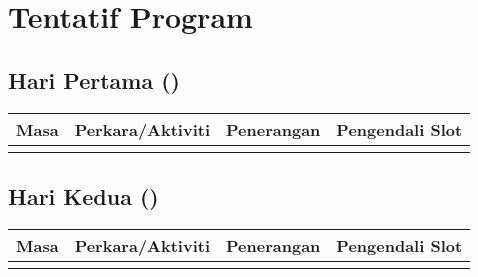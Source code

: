 \documentclass[a4paper,12pt]{article}
\begin{document}
\section{Tentatif Program}
\subsection{Hari Pertama ()}
\begin{longtable}{|p{2cm}|p{3cm}|p{7cm}|p{3cm}|}
    \hline
    \rowcolor{lightgray}
    \textbf{Masa} & \textbf{Perkara/Aktiviti} & \textbf{Penerangan} & \textbf{Pengendali Slot} \\
    \hline
    \endhead
    
     &  &  &  \\
    \hline
    
\end{longtable}

\subsection{Hari Kedua ()}
\begin{longtable}{|p{2cm}|p{3cm}|p{7cm}|p{3cm}|}
    \hline
    \rowcolor{lightgray}
    \textbf{Masa} & \textbf{Perkara/Aktiviti} & \textbf{Penerangan} & \textbf{Pengendali Slot} \\
    \hline
    \endhead
    
     &  &  &  \\
    \hline
    
\end{longtable}

\end{document}

